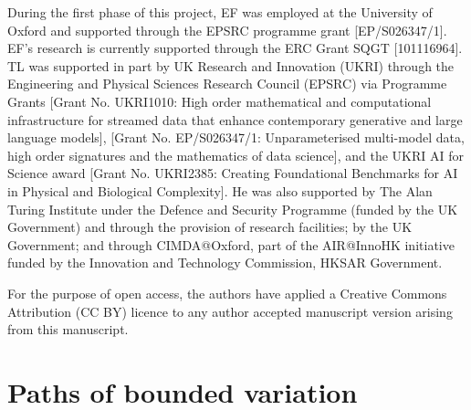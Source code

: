 \documentclass{article}
\numberwithin{equation}{section}
\theoremstyle{definition}
\theoremstyle{remark}
\begin{document}
During the first phase of this project, EF was employed at the University of Oxford and supported through the EPSRC programme grant [EP/S026347/1]. EF's research is currently supported through the ERC Grant SQGT [101116964]. TL was supported in part by UK Research and Innovation (UKRI) through the Engineering and Physical Sciences Research Council (EPSRC) via Programme Grants [Grant No. UKRI1010: High order mathematical and computational infrastructure for streamed data that enhance contemporary generative and large language models], [Grant No. EP/S026347/1: Unparameterised multi-model data, high order signatures and the mathematics of data science], and the UKRI AI for Science award [Grant No. UKRI2385: Creating Foundational Benchmarks for AI in Physical and Biological Complexity]. He was also supported by The Alan Turing Institute under the Defence and Security Programme (funded by the UK Government) and through the provision of research facilities; by the UK Government; and through CIMDA@Oxford, part of the AIR@InnoHK initiative funded by the Innovation and Technology Commission, HKSAR Government.

For the purpose of open access, the authors have applied a Creative Commons Attribution (CC BY) licence to any author accepted manuscript version arising from this manuscript.


\section{Paths of bounded variation}\label{sec:1var}
\end{document}

